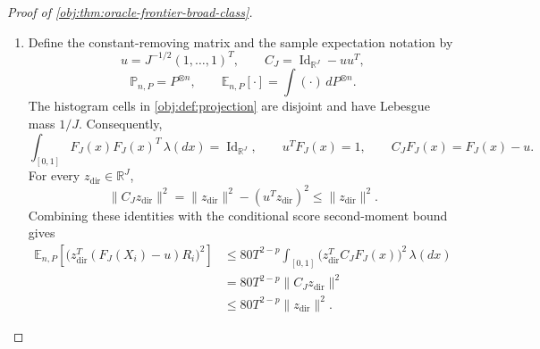 \begin{proof}[Proof of \cref{obj:thm:oracle-frontier-broad-class}]
\begin{enumerate}
The elementary clipping inequalities are
\[
|y-\ell_T(y)|\le |y|^pT^{1-p},
\qquad
\ell_T(y)^2\le |y|^pT^{2-p}.
\]
Indeed, when \(|y|\le T\), the first difference vanishes and
\[
y^2=|y|^p|y|^{2-p}\le |y|^pT^{2-p}.
\]
When \(|y|>T\), the clipping remainder is at most \(|y|\), and
\[
|y|
=|y|^p|y|^{1-p}
\le |y|^pT^{1-p},
\qquad
\ell_T(y)^2\le T^2
=T^pT^{2-p}\le |y|^pT^{2-p}.
\]
The raw moment restriction gives first-moment integrability in both arms, using \(|y|\le1+|y|^p\). Integrating the two clipping inequalities yields, for \(\lambda\)-almost every \(x\),
\[
\left|\int_{\mathbb R}(y-\ell_T(y))\,Q_{\iota_{\mathrm{arm}},P}(dy\mid x)\right|
\le10T^{1-p},
\qquad
\int_{\mathbb R}\ell_T(y)^2\,Q_{\iota_{\mathrm{arm}},P}(dy\mid x)
\le10T^{2-p}
\quad(\iota_{\mathrm{arm}}\in\{0,1\}).
\]

Define the clipped conditional score mean by
\[
g_{T,P}(x)
=
\int_{\mathbb R}\ell_T(y)\,Q_{1,P}(dy\mid x)
-
\int_{\mathbb R}\ell_T(y)\,Q_{0,P}(dy\mid x).
\]
Cancellation of the arm probabilities against the inverse-propensity denominators identifies this function as the conditional mean of \(R_i\). The conditional arm-mean identities then give
\[
|g_{T,P}(x)-\tau_P(x)|\le20T^{1-p}=b
\]
almost everywhere. The conditional second moment of the score satisfies
\[
\begin{aligned}
\mathbb E(R_i^2\mid X_i=x)
&=
\frac{\int\ell_T(y)^2\,Q_{1,P}(dy\mid x)}{e_P(x)}
+
\frac{\int\ell_T(y)^2\,Q_{0,P}(dy\mid x)}{1-e_P(x)}
\\
&\le40T^{2-p}+40T^{2-p}
=80T^{2-p}.
\end{aligned}
\]

\item Define the constant-removing matrix and the sample expectation notation by
\[
u=J^{-1/2}(1,\ldots,1)^T,\qquad
C_J=\operatorname{Id}_{\mathbb R^J}-uu^T,
\]
\[
\mathbb P_{n,P}=P^{\otimes n},
\qquad
\mathbb E_{n,P}[\cdot]=\int(\cdot)\,dP^{\otimes n}.
\]
The histogram cells in \cref{obj:def:projection} are disjoint and have Lebesgue mass \(1/J\). Consequently,
\[
\int_{[0,1]}F_J(x)F_J(x)^T\,\lambda(dx)
=\operatorname{Id}_{\mathbb R^J},
\qquad
u^TF_J(x)=1,
\qquad
C_JF_J(x)=F_J(x)-u.
\]
For every \(z_{\mathrm{dir}}\in\mathbb R^J\),
\[
\|C_Jz_{\mathrm{dir}}\|^2
=\|z_{\mathrm{dir}}\|^2-(u^Tz_{\mathrm{dir}})^2
\le\|z_{\mathrm{dir}}\|^2.
\]
Combining these identities with the conditional score second-moment bound gives
\[
\begin{aligned}
\mathbb E_{n,P}
\!\left[\bigl(z_{\mathrm{dir}}^T(F_J(X_i)-u)R_i\bigr)^2\right]
&\le80T^{2-p}
\int_{[0,1]}
\bigl(z_{\mathrm{dir}}^TC_JF_J(x)\bigr)^2\,\lambda(dx)
\\
&=80T^{2-p}\|C_Jz_{\mathrm{dir}}\|^2
\\
&\le80T^{2-p}\|z_{\mathrm{dir}}\|^2.
\end{aligned}
\]


\end{enumerate}
\end{proof}
